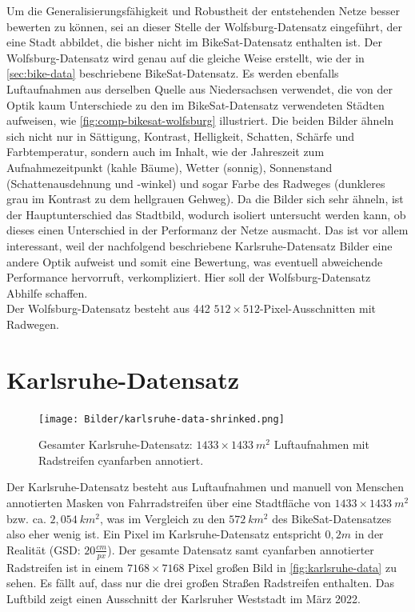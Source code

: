 Um die Generalisierungsfähigkeit und Robustheit der entstehenden Netze besser bewerten zu können, sei an dieser Stelle 
der Wolfsburg-Datensatz eingeführt, der eine Stadt abbildet, die bisher nicht im BikeSat-Datensatz enthalten ist. 
Der Wolfsburg-Datensatz wird genau auf die gleiche Weise erstellt, wie 
der in \autoref{sec:bike-data} beschriebene BikeSat-Datensatz. Es werden ebenfalls Luftaufnahmen aus derselben Quelle
aus Niedersachsen verwendet, 
die von der Optik kaum Unterschiede zu den im BikeSat-Datensatz verwendeten Städten aufweisen, wie 
\autoref{fig:comp-bikesat-wolfsburg} illustriert. Die beiden Bilder ähneln sich nicht nur in Sättigung, Kontrast,
Helligkeit, Schatten, Schärfe und Farbtemperatur, sondern auch im Inhalt, wie der Jahreszeit zum Aufnahmezeitpunkt 
(kahle Bäume), Wetter (sonnig), Sonnenstand (Schattenausdehnung und -winkel) und sogar Farbe des Radweges 
(dunkleres grau im Kontrast zu dem hellgrauen Gehweg). Da die Bilder sich sehr ähneln, ist der Hauptunterschied 
das Stadtbild, wodurch isoliert untersucht werden kann, ob dieses einen Unterschied in der Performanz der Netze ausmacht. 
Das ist vor allem interessant, weil der nachfolgend beschriebene Karlsruhe-Datensatz Bilder eine andere Optik 
aufweist und somit eine Bewertung, was eventuell abweichende Performance hervorruft, verkompliziert.
Hier soll der Wolfsburg-Datensatz Abhilfe schaffen. \\ 
Der Wolfsburg-Datensatz besteht aus 442 $512{\times}512$-Pixel-Ausschnitten mit Radwegen. 

\section{Karlsruhe-Datensatz} \label{sec:karlsruhe}


\begin{figure}[h]
	\centering
	\texttt{[image: Bilder/karlsruhe-data-shrinked.png]} 
	\caption{Gesamter Karlsruhe-Datensatz: $1433{\times}1433~ m^2$ Luftaufnahmen mit Radstreifen cyanfarben annotiert.}
	\label{fig:karlsruhe-data}
\end{figure} 

Der Karlsruhe-Datensatz besteht aus Luftaufnahmen und manuell von Menschen annotierten Masken von Fahrradstreifen 
über eine Stadtfläche von $1433{\times}1433~ m^2$ bzw. ca. $2,054~ km^2$, was im Vergleich zu den 
$572~ km^2$ des BikeSat-Datensatzes also eher wenig ist. 
Ein Pixel im Karlsruhe-Datensatz entspricht $0,2m$ in der Realität (GSD: $20 \frac{cm}{px}$).
Der gesamte Datensatz samt cyanfarben annotierter Radstreifen ist in einem 
$7168{\times}7168$ Pixel großen Bild in \autoref{fig:karlsruhe-data} zu sehen. Es fällt auf, 
dass nur die drei großen Straßen Radstreifen enthalten. Das Luftbild zeigt einen Ausschnitt der Karlsruher Weststadt im März 2022. 


